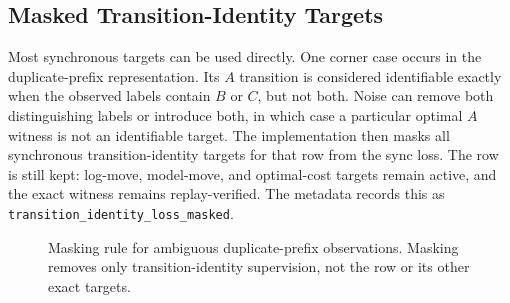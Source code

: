 \documentclass[11pt]{article}
\begin{document}
\FloatBarrier

\subsection{Masked Transition-Identity Targets}

Most synchronous targets can be used directly. One corner case occurs in the
duplicate-prefix representation. Its $A$ transition is considered identifiable
exactly when the observed labels contain $B$ or $C$, but not both. Noise can
remove both distinguishing labels or introduce both, in which case a particular
optimal $A$ witness is not an identifiable target. The implementation then
masks all synchronous transition-identity targets for that row from the sync
loss. The row is still kept: log-move, model-move, and optimal-cost targets remain active, and the
exact witness remains replay-verified. The metadata records this as
\texttt{transition\_identity\_loss\_masked}.

\begin{figure}[htbp]
\centering
{}
\caption{Masking rule for ambiguous duplicate-prefix observations. Masking
removes only transition-identity supervision, not the row or its other exact
targets.}
\label{fig:identity-mask}
\end{figure}
\end{document}
